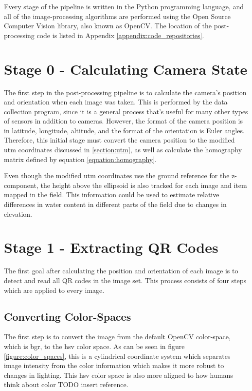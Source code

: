 Every stage of the pipeline is written in the Python programming language, and all of the image-processing algorithms are performed using the Open Source Computer Vision library, also known as OpenCV.  The location of the post-processing code is listed in Appendix \ref{appendix:code_repositories}.

\section{Stage 0 - Calculating Camera State}
\label{processing-stage0}

The first step in the post-processing pipeline is to calculate the camera's position and orientation when each image was taken.  This is performed by the data collection program, since it is a general process that's useful for many other types of sensors in addition to cameras.  However, the format of the camera position is in latitude, longitude, altitude, and the format of the orientation is Euler angles.  Therefore, this initial stage must convert the camera position to the modified \ac{utm} coordinates discussed in \ref{section:utm}, as well as calculate the homography matrix defined by equation \ref{equation:homography}.  

Even though the modified \ac{utm} coordinates use the ground reference for the z-component, the height above the ellipsoid is also tracked for each image and item mapped in the field.  This information could be used to estimate relative differences in water content in different parts of the field due to changes in elevation. 

\section{Stage 1 - Extracting QR Codes}
\label{processing-stage1}

The first goal after calculating the position and orientation of each image is to detect and read all QR codes in the image set.  This process consists of four steps which are applied to every image.

\subsection{Converting Color-Spaces}

The first step is to convert the image from the default OpenCV color-space, which is \ac{bgr}, to the \ac{hsv} color space.  As can be seen in figure \ref{figure:color_spaces}, this is a cylindrical coordinate system which separates image intensity from the color information which makes it more robust to changes in lighting. This \ac{hsv} color space is also more aligned to how humans think about color TODO insert reference.

